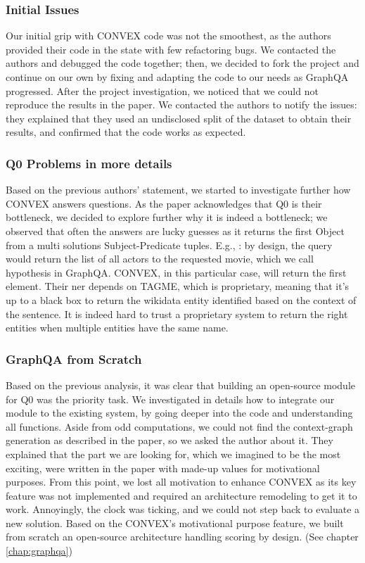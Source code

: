 \subsubsection{Initial Issues}
Our initial grip with CONVEX code was not the smoothest, as the authors provided their code in the state with few refactoring bugs. We contacted the authors and debugged the code together; then, we decided to fork the project and continue on our own by fixing and adapting the code to our needs as GraphQA progressed. After the project investigation, we noticed that we could not reproduce the results in the paper. We contacted the authors to notify the issues: they explained that they used an undisclosed split of the dataset to obtain their results, and confirmed that the code works as expected.

\subsubsection{Q0 Problems in more details}
Based on the previous authors' statement, we started to investigate further how CONVEX answers questions. As the paper acknowledges that Q0 is their bottleneck, we decided to explore further why it is indeed a bottleneck; we observed that often the answers are lucky guesses as it returns the first Object from a multi solutions Subject-Predicate tuples. E.g., : by design, the query would return the list of all actors to the requested movie, which we call hypothesis in GraphQA. CONVEX, in this particular case, will return the first element. Their \gls{ner} depends on TAGME, which is proprietary, meaning that it's up to a black box to return the \gls{wikidata} entity identified based on the context of the sentence. It is indeed hard to trust a proprietary system to return the right entities when multiple entities have the same name.

\subsubsection{GraphQA from Scratch}
Based on the previous analysis, it was clear that building an open-source module for Q0 was the priority task. We investigated in details how to integrate our module to the existing system, by going deeper into the code and understanding all functions. Aside from odd computations, we could not find the context-graph generation as described in the paper, so we asked the author about it. They explained that the part we are looking for, which we imagined to be the most exciting, were written in the paper with made-up values for motivational purposes. From this point, we lost all motivation to enhance CONVEX as its key feature was not implemented and required an architecture remodeling to get it to work. Annoyingly, the clock was ticking, and we could not step back to evaluate a new solution. Based on the CONVEX's motivational purpose feature, we built from scratch an open-source architecture handling scoring by design. (See chapter \ref{chap:graphqa})


